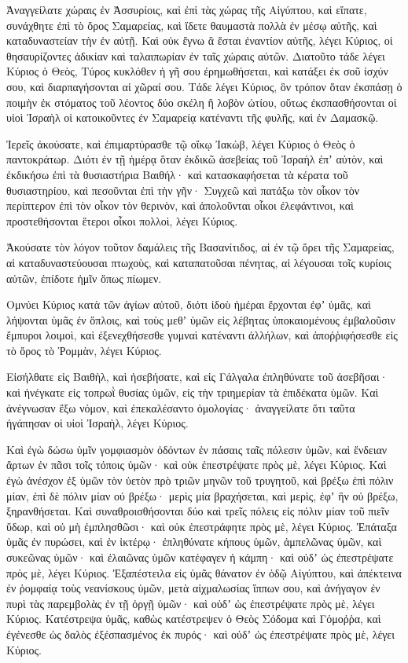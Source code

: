\begin{spacing}{1.1}
\begin{multicols}{2}
Ἀναγγείλατε χώραις ἐν Ἀσσυρίοις, καὶ ἐπὶ τὰς χώρας τῆς Αἰγύπτου, καὶ εἴπατε, συνάχθητε ἐπὶ τὸ ὄρος Σαμαρείας, καὶ ἴδετε θαυμαστὰ πολλὰ ἐν μέσῳ αὐτῆς, καὶ καταδυναστείαν τὴν ἐν αὐτῇ.
Καὶ οὐκ ἔγνω ἃ ἔσται ἐναντίον αὐτῆς, λέγει Κύριος, οἱ θησαυρίζοντες ἀδικίαν καὶ ταλαιπωρίαν ἐν ταῖς χώραις αὐτῶν.
Διατοῦτο τάδε λέγει Κύριος ὁ Θεὸς, Τύρος κυκλόθεν ἡ γῆ σου ἐρημωθήσεται, καὶ κατάξει ἐκ σοῦ ἰσχύν σου, καὶ διαρπαγήσονται αἱ χῶραί σου.
Τάδε λέγει Κύριος, ὃν τρόπον ὅταν ἐκσπάσῃ ὁ ποιμὴν ἐκ στόματος τοῦ λέοντος δύο σκέλη ἢ λοβὸν ὠτίου, οὕτως ἐκσπασθήσονται οἱ υἱοὶ Ἰσραὴλ οἱ κατοικοῦντες ἐν Σαμαρείᾳ κατέναντι τῆς φυλῆς, καὶ ἐν Δαμασκῷ.

Ἰερεῖς ἀκούσατε, καὶ ἐπιμαρτύρασθε τῷ οἴκῳ Ἰακὼβ, λέγει Κύριος ὁ Θεὸς ὁ παντοκράτωρ.
Διότι ἐν τῇ ἡμέρᾳ ὅταν ἐκδικῶ ἀσεβείας τοῦ Ἰσραὴλ ἐπʼ αὐτὸν, καὶ ἐκδικήσω ἐπὶ τὰ θυσιαστήρια Βαιθήλ· καὶ κατασκαφήσεται τὰ κέρατα τοῦ θυσιαστηρίου, καὶ πεσοῦνται ἐπὶ τὴν γῆν·
Συγχεῶ καὶ πατάξω τὸν οἶκον τὸν περίπτερον ἐπὶ τὸν οἶκον τὸν θερινὸν, καὶ ἀπολοῦνται οἶκοι ἐλεφάντινοι, καὶ προστεθήσονται ἕτεροι οἶκοι πολλοὶ, λέγει Κύριος.

Ἀκούσατε τὸν λόγον τοῦτον δαμάλεις τῆς Βασανίτιδος, αἱ ἐν τῷ ὄρει τῆς Σαμαρείας, αἱ καταδυναστεύουσαι πτωχοὺς, καὶ καταπατοῦσαι πένητας, αἱ λέγουσαι τοῖς κυρίοις αὐτῶν, ἐπίδοτε ἡμῖν ὅπως πίωμεν.

Ομνύει Κύριος κατὰ τῶν ἁγίων αὐτοῦ, διότι ἰδοὺ ἡμέραι ἔρχονται ἐφʼ ὑμᾶς, καὶ λήψονται ὑμᾶς ἐν ὅπλοις, καὶ τοὺς μεθʼ ὑμῶν εἰς λέβητας ὑποκαιομένους ἐμβαλοῦσιν ἔμπυροι λοιμοὶ,
καὶ ἐξενεχθήσεσθε γυμναὶ κατέναντι ἀλλήλων, καὶ ἀποῤῥιφήσεσθε εἰς τὸ ὄρος τὸ Ῥομμὰν, λέγει Κύριος.

Εἰσήλθατε εἰς Βαιθὴλ, καὶ ἠσεβήσατε, καὶ εἰς Γάλγαλα ἐπληθύνατε τοῦ ἀσεβῆσαι· καὶ ἠνέγκατε εἰς τοπρωῒ θυσίας ὑμῶν, εἰς τὴν τριημερίαν τὰ ἐπιδέκατα ὑμῶν.
Καὶ ἀνέγνωσαν ἔξω νόμον, καὶ ἐπεκαλέσαντο ὁμολογίας· ἀναγγείλατε ὅτι ταῦτα ἠγάπησαν οἱ υἱοὶ Ἰσραὴλ, λέγει Κύριος.

Καὶ ἐγὼ δώσω ὑμῖν γομφιασμὸν ὀδόντων ἐν πάσαις ταῖς πόλεσιν ὑμῶν, καὶ ἔνδειαν ἄρτων ἐν πᾶσι τοῖς τόποις ὑμῶν· καὶ οὐκ ἐπεστρέψατε πρὸς μὲ, λέγει Κύριος.
Καὶ ἐγὼ ἀνέσχον ἐξ ὑμῶν τὸν ὑετὸν πρὸ τριῶν μηνῶν τοῦ τρυγητοῦ, καὶ βρέξω ἐπὶ πόλιν μίαν, ἐπὶ δὲ πόλιν μίαν οὐ βρέξω· μερὶς μία βραχήσεται, καὶ μερὶς, ἐφʼ ἣν οὐ βρέξω, ξηρανθήσεται.
Καὶ συναθροισθήσονται δύο καὶ τρεῖς πόλεις εἰς πόλιν μίαν τοῦ πιεῖν ὕδωρ, καὶ οὐ μὴ ἐμπλησθῶσι· καὶ οὐκ ἐπεστράφητε πρὸς μὲ, λέγει Κύριος.
Ἐπάταξα ὑμᾶς ἐν πυρώσει, καὶ ἐν ἰκτέρῳ· ἐπληθύνατε κήπους ὑμῶν, ἀμπελῶνας ὑμῶν, καὶ συκεῶνας ὑμῶν· καὶ ἐλαιῶνας ὑμῶν κατέφαγεν ἡ κάμπη· καὶ οὐδʼ ὡς ἐπεστρέψατε πρὸς μὲ, λέγει Κύριος.
Ἐξαπέστειλα εἰς ὑμᾶς θάνατον ἐν ὁδῷ Αἰγύπτου, καὶ ἀπέκτεινα ἐν ῥομφαίᾳ τοὺς νεανίσκους ὑμῶν, μετὰ αἰχμαλωσίας ἵππων σου, καὶ ἀνήγαγον ἐν πυρὶ τὰς παρεμβολὰς ἐν τῇ ὀργῇ ὑμῶν· καὶ οὐδʼ ὡς ἐπεστρέψατε πρὸς μὲ, λέγει Κύριος.
Κατέστρεψα ὑμᾶς, καθὼς κατέστρεψεν ὁ Θεὸς Σόδομα καὶ Γόμοῤῥα, καὶ ἐγένεσθε ὡς δαλὸς ἐξέσπασμένος ἐκ πυρός· καὶ οὐδʼ ὡς ἐπεστρέψατε πρὸς μὲ, λέγει Κύριος.


\end{multicols}
\end{spacing}
